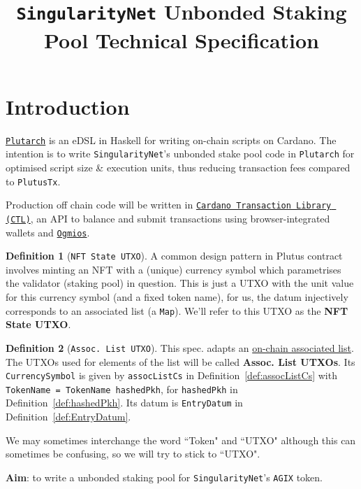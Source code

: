 \documentclass[10pt, a4paper]{article}
\title{\huge \textbf{\texttt{SingularityNet} Unbonded Staking Pool Technical Specification}}
\theoremstyle{definition}
\newtheorem{definition}{Definition}[section]
\begin{document}
\maketitle
\tableofcontents

\section{Introduction}
\href{https://github.com/Plutonomicon/plutarch}{\texttt{Plutarch}} is an eDSL in Haskell
for writing on-chain scripts on Cardano. The intention is to write \texttt{SingularityNet}'s unbonded stake pool code in \texttt{Plutarch} for optimised script size \& execution units, thus reducing transaction fees compared to \texttt{PlutusTx}.

Production off chain code will be written in \href{https://github.com/Plutonomicon/cardano-browser-tx/}{\texttt{Cardano Transaction Library (CTL)}}, an API to balance and submit transactions using browser-integrated wallets and \href{https://ogmios.dev/getting-started/basics/}{\texttt{Ogmios}}.

\begin{definition}[\texttt{NFT State UTXO}]\label{def:NFTState} A common design pattern in Plutus contract involves minting an NFT with a (unique) currency symbol which parametrises the validator (staking pool) in question. This is just a UTXO with the unit value for this currency symbol (and a fixed token name), for us, the datum injectively corresponds to an associated list (a \texttt{Map}). We'll refer to this UTXO as the \textbf{NFT State UTXO}.
\end{definition}

\begin{definition}[\texttt{Assoc. List UTXO}]\label{def:AssocListUTXO} This spec. adapts an \href{https://github.com/Plutonomicon/plutonomicon/blob/main/assoc.md}{on-chain associated list}. The UTXOs used for elements of the list will be called \textbf{Assoc. List UTXOs}. Its \texttt{CurrencySymbol} is given by \texttt{assocListCs} in Definition~\ref{def:assocListCs} with \texttt{TokenName = TokenName hashedPkh}, for \texttt{hashedPkh} in Definition~\ref{def:hashedPkh}. Its datum is \texttt{EntryDatum} in Definition~\ref{def:EntryDatum}.
\end{definition}

We may sometimes interchange the word ``Token" and ``UTXO" although this can sometimes be confusing, so we will try to stick to ``UTXO".

\textbf{Aim}: to write a unbonded staking pool for \texttt{SingularityNet}'s \texttt{AGIX} token.
\end{document}

